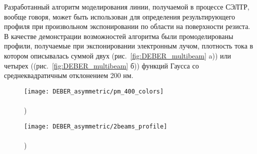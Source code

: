 Разработанный алгоритм моделирования линии, получаемой в процессе СЭЛТР, вообще говоря, может быть использован для определения результирующего профиля при произвольном экспонировании по области на поверхности резиста. В качестве демонстрации возможностей алгоритма были промоделированы профили, получаемые при экспонировании электронным лучом, плотность тока в котором описывалась суммой двух (рис.~\ref{fig:DEBER_multibeam} a)) или четырех ((рис.~\ref{fig:DEBER_multibeam} б)) функций Гаусса со среднеквадратичным отклонением 200 нм. 

\begin{figure}[h]
	\begin{minipage}{0.48\textwidth}
		\texttt{[image: DEBER\_asymmetric/pm\_400\_colors]} \\
		\vspace{-13em} \\ ) \\ \vspace{13em}
	\end{minipage}
	\begin{minipage}{0.48\textwidth}
		\texttt{[image: DEBER\_asymmetric/2beams\_profile]} \\
		\vspace{-13em} \\ ) \\ \vspace{13em}
	\end{minipage}
	
	\vspace{-3em}
	

\end{figure}
